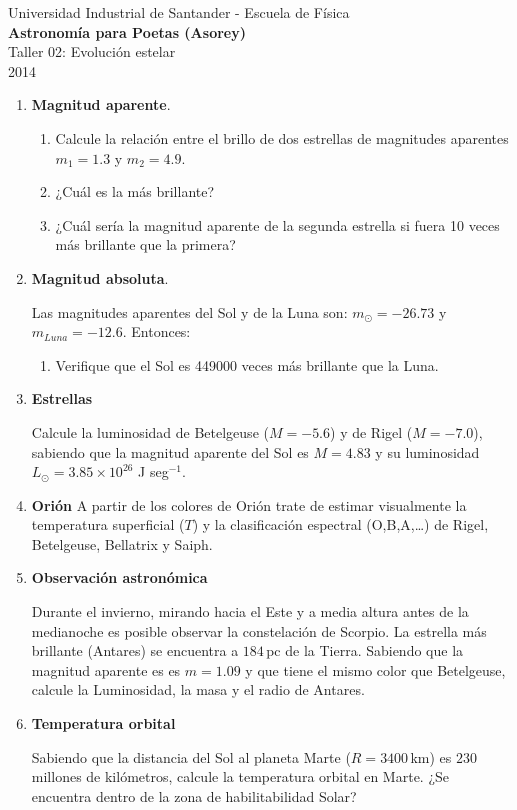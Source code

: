 \documentclass[a4paper,12pt]{article}
\begin{document}
\begin{center}
  {\small{Universidad Industrial de Santander - Escuela de Física}}\\
  {\bf{Astronomía para Poetas (Asorey)}}\\
  \vspace{0.4cm}
  Taller 02: Evolución estelar\\ 2014
\end{center}

\renewcommand{\labelenumi}{\arabic{enumi})}
\renewcommand{\labelenumii}{\arabic{enumii})}

\begin{enumerate}
  \item{\bf{Magnitud aparente}}.

    \begin{enumerate}
      \item Calcule la relación entre el brillo de dos estrellas de magnitudes aparentes $m_1=1.3$ y $m_2=4.9$.
      \item ¿Cuál es la más brillante?
      \item ¿Cuál sería la magnitud aparente de la segunda estrella si fuera 10 veces más brillante que la primera?
    \end{enumerate}

  \item{\bf{Magnitud absoluta}}.

    Las magnitudes aparentes del Sol y de la Luna son: $m_\odot=-26.73$ y $m_{Luna}=-12.6$. Entonces:
    \begin{enumerate}
      \item Verifique que el Sol es 449000 veces más brillante que la Luna.
    \end{enumerate}

  \item{\bf{Estrellas}}

    Calcule la luminosidad de Betelgeuse ($M=-5.6$) y de Rigel ($M=-7.0$),
    sabiendo que la magnitud aparente del Sol es $M=4.83$ y su luminosidad
    $L_\odot = 3.85\times10^{26}$ J seg$^{-1}$.

  \item{\bf{Orión}}
    A partir de los colores de Orión trate de estimar
    visualmente la temperatura superficial ($T$) y la clasificación espectral
    (O,B,A,\ldots) de Rigel, Betelgeuse, Bellatrix y Saiph.

  \item{\bf{Observación astronómica}}

    Durante el invierno, mirando hacia el Este y a media altura antes de la
    medianoche es posible observar la constelación de Scorpio. La estrella más
    brillante (Antares) se encuentra a $184$\,pc de la Tierra. Sabiendo que
    la magnitud aparente es es $m=1.09$ y que tiene el mismo color que
    Betelgeuse, calcule la Luminosidad, la masa y el radio de Antares.

  \item{\bf{Temperatura orbital}}

    Sabiendo que la distancia del Sol al planeta Marte ($R=3400$\,km) es $230$
    millones de kilómetros, calcule la temperatura orbital en Marte. ¿Se
    encuentra dentro de la zona de habilitabilidad Solar?


\end{enumerate}
\end{document}
